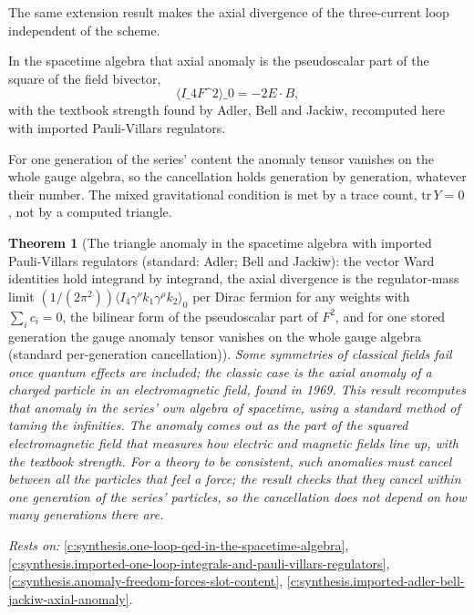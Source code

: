 \documentclass[11pt]{article}
\newtheorem{theorem}{Theorem}[section]
\theoremstyle{definition}
\theoremstyle{plain}
\begin{document}
The same extension result makes the axial divergence of the three-current loop independent of the scheme.

In the spacetime algebra that axial anomaly is the pseudoscalar part of the square of the field bivector, \[ \langle I\_{4}F\^{}{2}\rangle\_{0} = -2E\cdot B , \] with the textbook strength found by Adler, Bell and Jackiw, recomputed here with imported Pauli-Villars regulators.

For one generation of the series' content the anomaly tensor vanishes on the whole gauge algebra, so the cancellation holds generation by generation, whatever their number. The mixed gravitational condition is met by a trace count, $\mathrm{tr}\,Y = 0$, not by a computed triangle.

\begin{theorem}[The triangle anomaly in the spacetime algebra with imported Pauli-Villars regulators (standard: Adler; Bell and Jackiw): the vector Ward identities hold integrand by integrand, the axial divergence is the regulator-mass limit $(1/(2\pi^{2}))\langle I_{4}\gamma^{\nu}k_{1}\gamma^{\rho}k_{2}\rangle_{0}$ per Dirac fermion for any weights with $\sum_{i} c_{i} = 0$, the bilinear form of the pseudoscalar part of $F^{2}$, and for one stored generation the gauge anomaly tensor vanishes on the whole gauge algebra (standard per-generation cancellation)]\label{c:synthesis.triangle-anomaly-in-the-spacetime-algebra-is-the-pseudoscalar-part-of-the-field-square-and-cancels-per-generation}
Some symmetries of classical fields fail once quantum effects are included; the classic case is the axial anomaly of a charged particle in an electromagnetic field, found in 1969. This result recomputes that anomaly in the series' own algebra of spacetime, using a standard method of taming the infinities. The anomaly comes out as the part of the squared electromagnetic field that measures how electric and magnetic fields line up, with the textbook strength. For a theory to be consistent, such anomalies must cancel between all the particles that feel a force; the result checks that they cancel within one generation of the series' particles, so the cancellation does not depend on how many generations there are.
\end{theorem}
\noindent\emph{Rests on:} \ref{c:synthesis.one-loop-qed-in-the-spacetime-algebra}, \ref{c:synthesis.imported-one-loop-integrals-and-pauli-villars-regulators}, \ref{c:synthesis.anomaly-freedom-forces-slot-content}, \ref{c:synthesis.imported-adler-bell-jackiw-axial-anomaly}.
\end{document}

